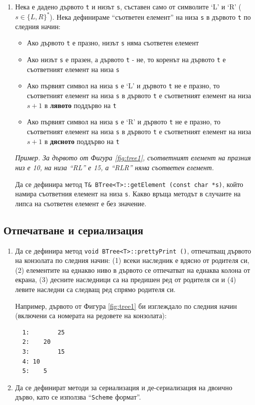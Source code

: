 \documentclass[12pt,a4paper]{article}
\begin{document}
\begin{enumerate}[]
	\item Нека е дадено дървото \texttt{t} и низът \texttt{s}, съставен само от символите `L' и `R' ($s \in \{L,R\}^*$). Нека дефинираме ``съответен елемент'' на низа \texttt{s} в дървото \texttt{t} по следния начин:
	\begin{itemize}
		\item Ако дървото \texttt{t} е празно, низът \texttt{s} няма съответен елемент
		\item Ако низът \texttt{s} е празен, а дървото \texttt{t} - не, то коренът на дървото \texttt{t} е съответният елемент на низа \texttt{s}
		\item Ако първият символ на низа \texttt{s} е `L' и дървото \texttt{t} не е празно, то съответният елемент на низа \texttt{s} в дървото \texttt{t} е съответният елемент на низа $s+1$ в \textbf{лявото} поддърво на \texttt{t}
		\item Ако първият символ на низа \texttt{s} е `R' и дървото \texttt{t} не е празно, то съответният елемент на низа \texttt{s} в дървото \texttt{t} е съответният елемент на низа $s+1$ в \textbf{дясното} поддърво на \texttt{t}
	\end{itemize}

	\textit{Пример. За 	дървото от Фигура \ref{fig:tree1}, съответният елемент на празния низ е 10, на низа ``RL'' е 15, а ``RLR'' няма съответен елемент.}

	Да се дефинира метод \texttt{T\& BTree<T>::getElement (const char *s)}, който намира съответния елемент на низа \texttt{s}. Какво връща методът в случаите на липса на съответен елемент е без значение.


\end{enumerate}

\subsection {Отпечатване и сериализация}

\begin{enumerate}[resume]

  \item Да се дефинира метод \texttt{void BTree<T>::prettyPrint ()}, отпечатващ дървото на конзолата по следния начин: (1) всеки наследник е вдясно от родителя си, (2) елементите на еднакво ниво в дървото се отпечатват на еднаква колона от екрана, (3) десните наследници са на предишен ред от родителя си и (4) левите наследни са следващ ред спрямо родителя си.

  Например, дървото от Фигура \ref{fig:tree1} би изглеждало по следния начин (включени са номерата на редовете на конзолата):

  \begin{verbatim}
  1:        25
  2:    20
  3:        15
  4: 10
  5:    5
  \end{verbatim}



  \item Да се дефинират методи за сериализация и де-сериализация на двоично дърво, като се използва ``\texttt{Scheme} формат''.
\end{enumerate}
\end{document}
